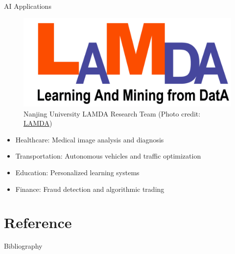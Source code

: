\documentclass{ctexbeamer}
\begin{document}
\begin{frame}{AI Applications}
    \begin{figure}
    \centering
    \includegraphics[width=0.5\linewidth]{images/lamda.png}
    \caption{Nanjing University LAMDA Research Team (Photo credit: \href{https://lamda.nju.edu.cn/}{LAMDA})}
    \label{fig:ai_apps}
    \end{figure}
    \begin{itemize}
        \item Healthcare: Medical image analysis and diagnosis
        \item Transportation: Autonomous vehicles and traffic optimization
        \item Education: Personalized learning systems
        \item Finance: Fraud detection and algorithmic trading
    \end{itemize}
\end{frame}
\section{Reference}
\begin{frame}[allowframebreaks]{Bibliography}
    \printbibliography
\end{frame}
\end{document}
